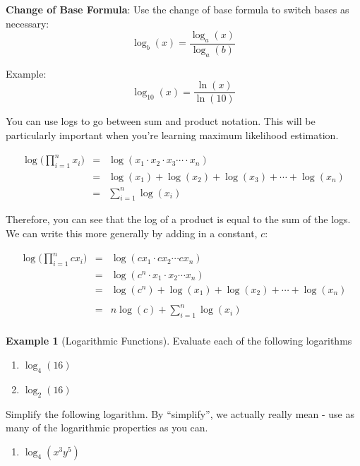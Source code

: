 \documentclass[]{book}
\providecommand{\tightlist}{%
  \setlength{\itemsep}{0pt}\setlength{\parskip}{0pt}}
\theoremstyle{definition}
\theoremstyle{definition}
\newtheorem{example}{Example}[chapter]
\theoremstyle{definition}
\theoremstyle{remark}
\begin{document}
\textbf{Change of Base Formula}: Use the change of base formula to switch bases as necessary:
\[\log_b(x) = \frac{\log_a(x)}{\log_a(b)}\]

Example: \[\log_{10}(x) = \frac{\ln(x)}{\ln(10)}\]

You can use logs to go between sum and product notation. This will be particularly important when you're learning maximum likelihood estimation.

\begin{eqnarray*}
            \log \bigg(\prod\limits_{i=1}^n x_i \bigg) &=& \log(x_1 \cdot x_2 \cdot x_3 \cdots \cdot x_n)\\
            &=& \log(x_1) + \log(x_2) + \log(x_3) + \cdots + \log(x_n)\\
            &=& \sum\limits_{i=1}^n \log (x_i)
\end{eqnarray*}

Therefore, you can see that the log of a product is equal to the sum of the logs. We can write this more generally by adding in a constant, \(c\):

\begin{eqnarray*}
            \log \bigg(\prod\limits_{i=1}^n c x_i\bigg) &=& \log(cx_1 \cdot cx_2 \cdots cx_n)\\
            &=& \log(c^n \cdot x_1 \cdot x_2 \cdots x_n)\\
            &=& \log(c^n) + \log(x_1) + \log(x_2) + \cdots + \log(x_n)\\\\
            &=& n \log(c) +  \sum\limits_{i=1}^n \log (x_i)\\
\end{eqnarray*}

\begin{example}[Logarithmic Functions]
\protect\hypertarget{exm:log}{}{\label{exm:log} {} }
Evaluate each of the following logarithms

\begin{enumerate}
\def\labelenumi{\arabic{enumi}.}
\item
  \(\log_4(16)\)
\item
  \(\log_2(16)\)
\end{enumerate}

Simplify the following logarithm. By ``simplify'', we actually really mean - use as many of the logarithmic properties as you can.

\begin{enumerate}
\def\labelenumi{\arabic{enumi}.}
\setcounter{enumi}{2}
\tightlist
\item
  \(\log_4(x^3y^5)\)
\end{enumerate}
\end{example}
\end{document}
